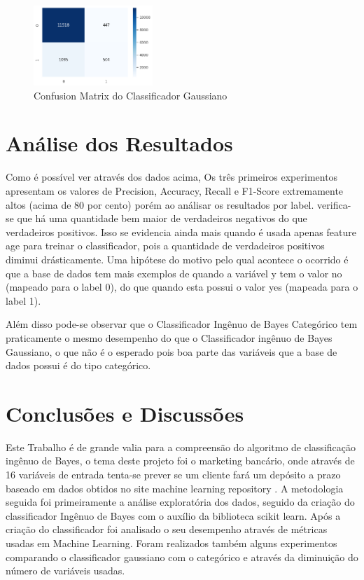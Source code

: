 \documentclass[conference]{IEEEtran}
\begin{document}
\begin{figure}[H]
    \centerline{\includegraphics[width=0.4\textwidth]{IMGS/cm-gnb-numeric.png}}
    \caption{\label{fig:cm3-gnb}Confusion Matrix do Classificador Gaussiano}
\end{figure}


\section{Análise dos Resultados}

Como é possível ver através dos dados acima, Os três primeiros experimentos apresentam os valores de Precision, Accuracy, Recall e F1-Score
extremamente altos (acima de 80 por cento) porém ao análisar os resultados por label. verifica-se que há uma quantidade bem maior de verdadeiros negativos do que verdadeiros positivos.
Isso se evidencia ainda mais quando é usada apenas feature age para treinar o classificador, pois a quantidade de verdadeiros positivos diminui drásticamente.
Uma hipótese do motivo pelo qual acontece o ocorrido é que a base de dados tem mais exemplos de quando a variável y tem o valor no (mapeado para o label 0),
do que quando esta possui o valor yes (mapeada para o label 1).

Além disso pode-se observar que o Classificador Ingênuo de Bayes Categórico tem praticamente o mesmo desempenho do que o Classificador ingênuo de Bayes Gaussiano, o que não é o esperado pois boa parte das variáveis que a base de dados possui é do tipo categórico.


\section{Conclusões e Discussões}


Este Trabalho é de grande valia para a compreensão do algoritmo de classificação ingênuo de Bayes, o tema deste projeto foi o marketing bancário, onde através de 16 variáveis de entrada tenta-se prever se um cliente fará um depósito a prazo baseado em dados obtidos no site machine learning repository \cite{b1}. A metodologia seguida foi primeiramente a análise exploratória dos dados, seguido da criação  do classificador Ingênuo de Bayes com o auxílio da biblioteca scikit learn. Após a criação do classificador foi analisado o seu desempenho através de métricas usadas em Machine Learning.
Foram realizados também alguns experimentos comparando o classificador gaussiano com o categórico e através da diminuição do número de variáveis usadas.
\end{document}
